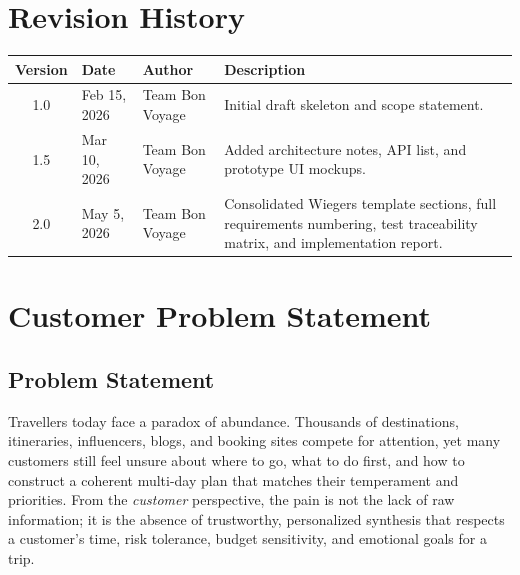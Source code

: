 \documentclass[12pt,oneside,openany]{report}
\begin{document}
\cleardoublepage
{}
{}
\tableofcontents

\cleardoublepage
\chapter*{Revision History}
\thispagestyle{fancy}

\begin{table}[H]
\centering
\begin{tabularx}{0.95\textwidth}{|c|l|l|X|}
\hline
\textbf{Version} & \textbf{Date} & \textbf{Author} & \textbf{Description} \\
\hline
1.0 & Feb 15, 2026 & Team Bon Voyage & Initial draft skeleton and scope statement. \\
\hline
1.5 & Mar 10, 2026 & Team Bon Voyage & Added architecture notes, API list, and prototype UI mockups. \\
\hline
2.0 & May 5, 2026 & Team Bon Voyage & Consolidated Wiegers template sections, full requirements numbering, test traceability matrix, and implementation report. \\
\hline
\end{tabularx}
\end{table}

\cleardoublepage
{}
\setcounter{page}{1}

\setcounter{chapter}{0}

\chapter{Customer Problem Statement}\label{ch:customer}

\section{Problem Statement}

Travellers today face a paradox of abundance. Thousands of destinations, itineraries, influencers, blogs, and booking sites compete for attention, yet many customers still feel unsure about where to go, what to do first, and how to construct a coherent multi-day plan that matches their temperament and priorities. From the \emph{customer} perspective, the pain is not the lack of raw information; it is the absence of trustworthy, personalized synthesis that respects a customer's time, risk tolerance, budget sensitivity, and emotional goals for a trip.
\end{document}
